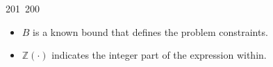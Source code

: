 201~200~\documentclass{article}
\begin{document}
\begin{enumerate}
\begin{itemize}
	                                                                        	                                                                    	                                	                    	                    	                        	                        	                    	                                                                	                	                                                                    	                \item \(B\) is a known bound that defines the problem constraints.
	                                                                        	                                                                    	                                	                    	                    	                        	                        	                    	                                                                	                	                                                                    	                    \item \(\mathbb{Z}(\cdot)\) indicates the integer part of the expression within.
	                                                                        	                                                                    	                                	                    	                    	                        	                        	                    	                                                                	                	                                                                    	                    \end{itemize}

	                                                                        	                                                                    	                                	                    	                    	                        	                        	                    	                                                                	                	                                                                    	                    \end{enumerate}
\end{document}

